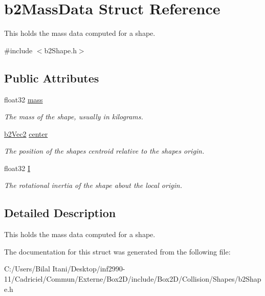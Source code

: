 \hypertarget{structb2_mass_data}{}\section{b2\+Mass\+Data Struct Reference}
\label{structb2_mass_data}


This holds the mass data computed for a shape.  




{\ttfamily \#include $<$b2\+Shape.\+h$>$}

\subsection*{Public Attributes}
\begin{DoxyCompactItemize}
\item 
float32 \hyperlink{structb2_mass_data_aea85d9595a38d2eed05b8d2ea80d97b1}{mass}\hypertarget{structb2_mass_data_aea85d9595a38d2eed05b8d2ea80d97b1}{}\label{structb2_mass_data_aea85d9595a38d2eed05b8d2ea80d97b1}

\begin{DoxyCompactList}\small\item\em The mass of the shape, usually in kilograms. \end{DoxyCompactList}\item 
\hyperlink{structb2_vec2}{b2\+Vec2} \hyperlink{structb2_mass_data_a1d59bebc7030c4dded0c2febc57ebdd7}{center}\hypertarget{structb2_mass_data_a1d59bebc7030c4dded0c2febc57ebdd7}{}\label{structb2_mass_data_a1d59bebc7030c4dded0c2febc57ebdd7}

\begin{DoxyCompactList}\small\item\em The position of the shape\textquotesingle{}s centroid relative to the shape\textquotesingle{}s origin. \end{DoxyCompactList}\item 
float32 \hyperlink{structb2_mass_data_ad2d06e96e2d79d895df16ae0e5fe0376}{I}\hypertarget{structb2_mass_data_ad2d06e96e2d79d895df16ae0e5fe0376}{}\label{structb2_mass_data_ad2d06e96e2d79d895df16ae0e5fe0376}

\begin{DoxyCompactList}\small\item\em The rotational inertia of the shape about the local origin. \end{DoxyCompactList}\end{DoxyCompactItemize}


\subsection{Detailed Description}
This holds the mass data computed for a shape. 

The documentation for this struct was generated from the following file\+:\begin{DoxyCompactItemize}
\item 
C\+:/\+Users/\+Bilal Itani/\+Desktop/inf2990-\/11/\+Cadriciel/\+Commun/\+Externe/\+Box2\+D/include/\+Box2\+D/\+Collision/\+Shapes/b2\+Shape.\+h\end{DoxyCompactItemize}
